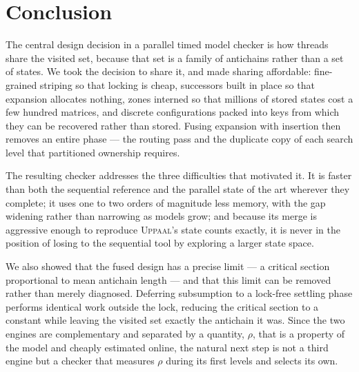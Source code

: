 \section{Conclusion}\label{sec:concl}

The central design decision in a parallel timed model checker is how threads share the visited
set, because that set is a family of antichains rather than a set of states. We took the
decision to share it, and made sharing affordable: fine-grained striping so that locking is
cheap, successors built in place so that expansion allocates nothing, zones interned so that
millions of stored states cost a few hundred matrices, and discrete configurations packed into
keys from which they can be recovered rather than stored. Fusing expansion with insertion then
removes an entire phase --- the routing pass and the duplicate copy of each search level that
partitioned ownership requires.

The resulting checker addresses the three difficulties that motivated it. It is faster than
both the sequential reference and the parallel state of the art wherever they complete; it
uses one to two orders of magnitude less memory, with the gap widening rather than narrowing
as models grow; and because its merge is aggressive enough to reproduce \textsc{Uppaal}'s state
counts exactly, it is never in the position of losing to the sequential tool by exploring a
larger state space.

We also showed that the fused design has a precise limit --- a critical section proportional
to mean antichain length --- and that this limit can be removed rather than merely diagnosed.
Deferring subsumption to a lock-free settling phase performs identical work outside the lock,
reducing the critical section to a constant while leaving the visited set exactly the
antichain it was. Since the two engines are complementary and separated by a quantity, $\rho$,
that is a property of the model and cheaply estimated online, the natural next step is not a
third engine but a checker that measures $\rho$ during its first levels and selects its own.
